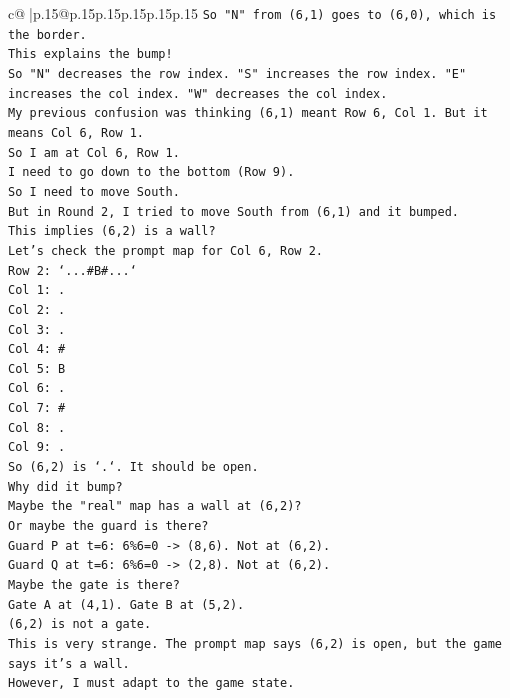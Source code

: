 \documentclass{article}
\begin{document}
{\begin{supertabular}{c@{$\;$}|p{.15\linewidth}@{}p{.15\linewidth}p{.15\linewidth}p{.15\linewidth}p{.15\linewidth}p{.15\linewidth}}
{{{\texttt{So "N" from (6,1) goes to (6,0), which is the border.} \\
\texttt{This explains the bump!} \\
\texttt{So "N" decreases the row index. "S" increases the row index. "E" increases the col index. "W" decreases the col index.} \\
\texttt{My previous confusion was thinking (6,1) meant Row 6, Col 1. But it means Col 6, Row 1.} \\
\texttt{So I am at Col 6, Row 1.} \\
\texttt{I need to go down to the bottom (Row 9).} \\
\texttt{So I need to move South.} \\
\texttt{But in Round 2, I tried to move South from (6,1) and it bumped.} \\
\texttt{This implies (6,2) is a wall?} \\
\texttt{Let's check the prompt map for Col 6, Row 2.} \\
\texttt{Row 2: `...\#B\#...`} \\
\texttt{Col 1: .} \\
\texttt{Col 2: .} \\
\texttt{Col 3: .} \\
\texttt{Col 4: \#} \\
\texttt{Col 5: B} \\
\texttt{Col 6: .} \\
\texttt{Col 7: \#} \\
\texttt{Col 8: .} \\
\texttt{Col 9: .} \\
\texttt{So (6,2) is `.`. It should be open.} \\
\texttt{Why did it bump?} \\
\texttt{Maybe the "real" map has a wall at (6,2)?} \\
\texttt{Or maybe the guard is there?} \\
\texttt{Guard P at t=6: 6\%6=0 {-}> (8,6). Not at (6,2).} \\
\texttt{Guard Q at t=6: 6\%6=0 {-}> (2,8). Not at (6,2).} \\
\texttt{Maybe the gate is there?} \\
\texttt{Gate A at (4,1). Gate B at (5,2).} \\
\texttt{(6,2) is not a gate.} \\
\texttt{This is very strange. The prompt map says (6,2) is open, but the game says it's a wall.} \\
\texttt{However, I must adapt to the game state.} \\
}}}
\end{supertabular}}
\end{document}
